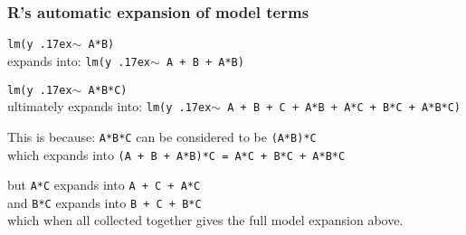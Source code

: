 \begin{frame}\frametitle{R's automatic expansion of model terms}
	\texttt{lm(y {\raise.17ex\hbox{$\scriptstyle\mathtt{\sim}$}} A*B)}\\
		\qquad expands into: {\color{blue}\texttt{lm(y {\raise.17ex\hbox{$\scriptstyle\mathtt{\sim}$}} A + B + A*B)}}
		
	\vspace{24pt}
	\texttt{lm(y {\raise.17ex\hbox{$\scriptstyle\mathtt{\sim}$}} A*B*C)}\\
		\qquad ultimately expands into: {\color{blue}\texttt{lm(y {\raise.17ex\hbox{$\scriptstyle\mathtt{\sim}$}} A + B + C + A*B + A*C + B*C + A*B*C)}}
		
		\vspace{12pt}
		\qquad 
		This is because: \texttt{A*B*C} can be considered to be \texttt{(A*B)*C} \\
		\qquad which expands into \texttt{(A + B + A*B)*C = A*C + B*C + A*B*C}
		
		\vspace{6pt}
		\qquad  but \texttt{A*C} expands into \texttt{A + C + A*C}\\
		\qquad  and \texttt{B*C} expands into \texttt{B + C + B*C} \\
		\qquad which when all collected together gives the full model expansion above.
\end{frame}

